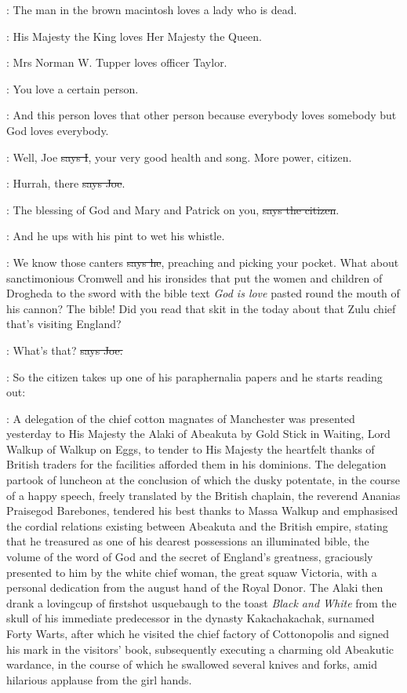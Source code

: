 :
The man in the brown macintosh loves a lady who is dead. 

:
His Majesty the King loves Her Majesty the Queen. 

:
Mrs Norman W. Tupper loves officer Taylor. 

:
You love a certain person. 

:
And this person loves that other person because everybody loves somebody
but God loves everybody.

:
Well, Joe \sout{says I},
your very good health and song. More power, citizen.

\joe:
Hurrah, there \sout{says Joe}.

\citizen:
The blessing of God and Mary and Patrick on you,
\sout{says the citizen}.

\Nq:
And he ups with his pint to wet his whistle.

\citizen:
We know those canters \sout{says he},
preaching and picking your pocket.
What about sanctimonious Cromwell and his ironsides that put the women
and children of Drogheda to the sword with the bible text \emph{God is love}
pasted round the mouth of his cannon? The bible! Did you read that skit in
the  today
about that Zulu chief that's visiting England?

\joe:
What's that? \sout{says Joe.}

\Nq:
So the citizen takes up one of his paraphernalia papers and he starts
reading out:

\citizen:
A delegation of the chief cotton
magnates of Manchester was presented
yesterday to His Majesty the Alaki of Abeakuta by Gold Stick in Waiting,
Lord Walkup of Walkup on Eggs, to tender to His Majesty the heartfelt
thanks of British traders for the facilities afforded them in his
dominions. The delegation partook of luncheon at the conclusion
of which the dusky potentate, in the course of a happy speech,
freely translated by the British chaplain, the reverend Ananias
Praisegod Barebones,
tendered his best thanks to Massa Walkup and
emphasised the cordial relations existing between Abeakuta and the
British empire, stating that he treasured as one of his dearest
possessions an illuminated bible, the volume of the word of God
and the secret of England's greatness, graciously presented to him by
the white chief woman, the great squaw Victoria, with a personal
dedication from the august hand of the Royal Donor. The Alaki then drank a
lovingcup of firstshot usquebaugh to the toast \emph{Black and White} from the
skull of his immediate predecessor in the dynasty Kakachakachak,
surnamed Forty Warts, after which he visited the chief factory of
Cottonopolis and signed his mark in the visitors' book,
subsequently
executing a charming old Abeakutic wardance, in the course of which he
swallowed several knives and forks, amid hilarious applause from the girl
hands.

